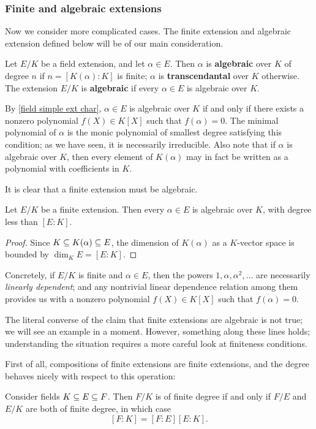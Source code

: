 \subsubsection{Finite and algebraic extensions}
Now we consider more complicated cases. The finite extension and algebraic extension defined below will be of our main consideration. 
\begin{definition}
Let $E/K$ be a field extension, and let $\alpha\in E$. Then $\alpha$ is \textbf{algebraic} over $K$ of degree $n$ if $n=[K(\alpha):K]$ is finite; $\alpha$ is \textbf{transcendantal} over $K$ otherwise. The extension $E/K$ is \textbf{algebraic} if every $\alpha\in E$ is algebraic over $K$.
\end{definition}
By \cref{field simple ext char}, $\alpha\in E$ is algebraic over $K$ if and only if there exists a nonzero polynomial $f(X)\in K[X]$ such that $f(\alpha)=0$. The minimal polynomial of $\alpha$ is the monic polynomial of smallest degree satisfying this condition; as we have seen, it is necessarily irreducible. Also note that if $\alpha$ is algebraic over $K$, then every element of $K(\alpha)$ may in fact
be written as a polynomial with coefficients in $K$.\par
It is clear that a finite extension must be algebraic.
\begin{proposition}\label{field extension finite is algebraic}
Let $E/K$ be a finite extension. Then every $\alpha\in E$ is algebraic over $K$, with degree less than $[E:K]$.
\end{proposition}
\begin{proof}
Since $K\subseteq K(\alpha)\subseteq E$, the dimension of $K(\alpha)$ as a $K$-vector space is bounded by $\dim_KE=[E:K]$.
\end{proof}
Concretely, if $E/K$ is finite and $\alpha\in E$, then the powers $1,\alpha,\alpha^2,\dots$ are necessarily \textit{linearly dependent}; and any nontrivial linear dependence relation among them provides us with a nonzero polynomial $f(X)\in K[X]$ such that $f(\alpha)=0$.\par
The literal converse of the claim that finite extensions are algebraic is not true; we will see an example in a moment. However, something along these lines holds; understanding the situation requires a more careful look at finiteness conditions.\par
First of all, compositions of finite extensions are finite extensions, and the degree behaves nicely with respect to this operation:
\begin{proposition}\label{field ext degree multiplicative}
Consider fields $K\subseteq E\subseteq F$. Then $F/K$ is of finite degree if and only if $F/E$ and $E/K$ are both of finite degree, in which case
\[[F:K]=[F:E][E:K].\]
\end{proposition}
